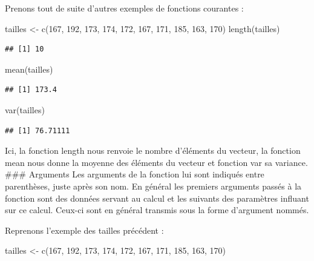 \documentclass[
]{book}
\newenvironment{Shaded}{\begin{snugshade}}{\end{snugshade}}
\newcommand{\DecValTok}[1]{\textcolor[rgb]{0.00,0.00,0.81}{#1}}
\newcommand{\FunctionTok}[1]{\textcolor[rgb]{0.00,0.00,0.00}{#1}}
\newcommand{\NormalTok}[1]{#1}
\newcommand{\OtherTok}[1]{\textcolor[rgb]{0.56,0.35,0.01}{#1}}
\begin{document}
Prenons tout de suite d'autres exemples de fonctions courantes :

\begin{Shaded}
\begin{Highlighting}[]
\NormalTok{tailles }\OtherTok{\textless{}{-}} \FunctionTok{c}\NormalTok{(}\DecValTok{167}\NormalTok{, }\DecValTok{192}\NormalTok{, }\DecValTok{173}\NormalTok{, }\DecValTok{174}\NormalTok{, }\DecValTok{172}\NormalTok{, }\DecValTok{167}\NormalTok{, }\DecValTok{171}\NormalTok{, }\DecValTok{185}\NormalTok{, }\DecValTok{163}\NormalTok{, }\DecValTok{170}\NormalTok{)}
\FunctionTok{length}\NormalTok{(tailles)}
\end{Highlighting}
\end{Shaded}

\begin{verbatim}
## [1] 10
\end{verbatim}

\begin{Shaded}
\begin{Highlighting}[]
\FunctionTok{mean}\NormalTok{(tailles)}
\end{Highlighting}
\end{Shaded}

\begin{verbatim}
## [1] 173.4
\end{verbatim}

\begin{Shaded}
\begin{Highlighting}[]
\FunctionTok{var}\NormalTok{(tailles)}
\end{Highlighting}
\end{Shaded}

\begin{verbatim}
## [1] 76.71111
\end{verbatim}

Ici, la fonction length nous renvoie le nombre d'éléments du vecteur, la fonction mean nous donne la moyenne des éléments du vecteur et fonction var sa variance.
\#\#\# Arguments
Les arguments de la fonction lui sont indiqués entre parenthèses, juste après son nom. En général les premiers arguments passés à la fonction sont des données servant au calcul et les suivants des paramètres influant sur ce calcul. Ceux-ci sont en général transmis sous la forme d'argument nommés.

Reprenons l'exemple des tailles précédent :

\begin{Shaded}
\begin{Highlighting}[]
\NormalTok{tailles }\OtherTok{\textless{}{-}} \FunctionTok{c}\NormalTok{(}\DecValTok{167}\NormalTok{, }\DecValTok{192}\NormalTok{, }\DecValTok{173}\NormalTok{, }\DecValTok{174}\NormalTok{, }\DecValTok{172}\NormalTok{, }\DecValTok{167}\NormalTok{, }\DecValTok{171}\NormalTok{, }\DecValTok{185}\NormalTok{, }\DecValTok{163}\NormalTok{, }\DecValTok{170}\NormalTok{)}
\end{Highlighting}
\end{Shaded}
\end{document}
